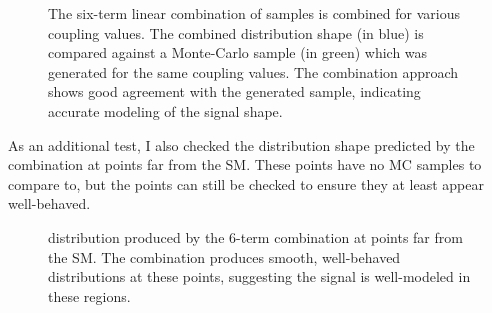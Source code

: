     \begin{figure}[tbh]
    	\centering
        \caption{
            The six-term linear combination of samples is combined for various coupling values.
            The combined distribution shape (in blue) is compared against a Monte-Carlo sample (in green) which was generated for the same coupling values.
            The combination approach shows good agreement with the generated sample, indicating accurate modeling of the signal shape.
        }
        \label{fig:vbf_hh_validation}
    \end{figure}

    As an additional test, I also checked the distribution shape predicted by the combination at points far from the SM.
    These points have no MC samples to compare to, but the points can still be checked to ensure they at least appear well-behaved.

    \begin{figure}[tbh]
        \centering
        \caption{
            \mhh distribution produced by the 6-term combination at points far from the SM.
            The combination produces smooth, well-behaved distributions at these points,
                suggesting the signal is well-modeled in these regions.
        }
        \label{fig:vbf_hh_6term_preview}
    \end{figure}


